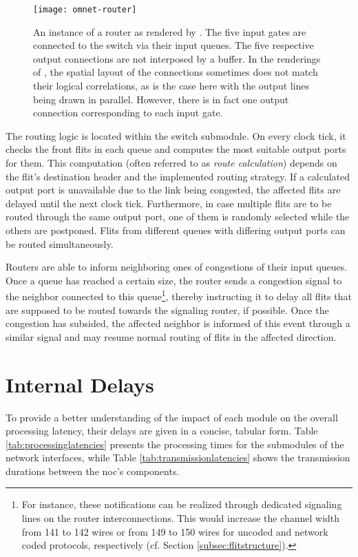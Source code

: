 \begin{figure}
    \centering
    \texttt{[image: omnet-router]}
    \caption[Simulator view of the router]{An instance of a router as rendered by \omnet{}. The five input gates are connected to the switch via their
    input queues. The five respective output connections are not interposed by a buffer. In the renderings of \omnet{}, the spatial layout of the
    connections sometimes does not match their logical correlations, as is the case here with the output lines being drawn in parallel. However, there is
    in fact one output connection corresponding to each input gate.}
    \label{fig:omnetrouter}
\end{figure}

The routing logic is located within the switch submodule. On every clock tick, it checks the front flits in each queue and computes the most suitable
output ports for them. This computation (often referred to as \textit{route calculation}) depends on the flit's destination header and the implemented routing
strategy. If a calculated output port is unavailable due to the link being congested, the affected flits are delayed until the next clock tick.
Furthermore, in case multiple flits are to be routed through the same output port, one of them is randomly selected while the others are postponed.
Flits from different queues with differing output ports can be routed simultaneously.

Routers are able to inform neighboring ones of congestions of their input queues. Once a queue has reached a certain size, the router sends a congestion signal to the
neighbor connected to this queue\footnote{For instance, these notifications can be realized through dedicated signaling lines on the router
interconnections. This would increase the channel width from 141 to 142 wires or from 149 to 150 wires for uncoded and network coded protocols,
respectively (cf. Section \ref{subsec:flitstructure}).}, thereby instructing it to delay all flits that are supposed to be routed towards the
signaling router, if possible. Once the congestion has subsided, the affected neighbor is informed of this event through a similar signal and may
resume normal routing of flits in the affected direction.

\section{Internal Delays}\label{sec:internaldelays}
To provide a better understanding of the impact of each module on the overall processing latency, their delays are given in a concise, tabular form.
Table \ref{tab:processinglatencies} presents the processing times for the submodules of the network interfaces, while Table
\vref{tab:transmissionlatencies} shows the transmission durations between the \gls{noc}'s components.

